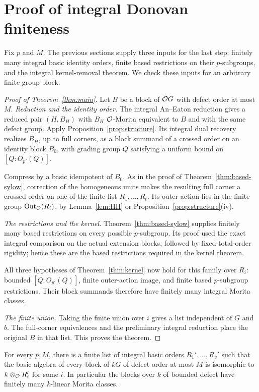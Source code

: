 \section{Proof of integral Donovan finiteness}\label{sec:assembly}

Fix $p$ and $M$.  The previous sections supply three inputs for the
last step: finitely many integral basic identity orders, finite based
restrictions on their $p$-subgroups, and the integral kernel-removal
theorem.  We check these inputs for an arbitrary finite-group block.

\begin{proof}[Proof of Theorem~\ref{thm:main}]
Let $B$ be a block of $\mathcal O G$ with defect order at most $M$.
\emph{Reduction and the identity order.}
The integral An--Eaton reduction gives a reduced pair
$(H,B_H)$ with $B_H$ $\mathcal O$-Morita equivalent to $B$ and with
the same defect group.  Apply
Proposition~\ref{prop:structure}.  Its integral dual recovery
realizes $B_H$, up to full corners, as a block summand of a
crossed order on an identity block $B_0$, with grading group
$Q$ satisfying a uniform bound on $[Q:O_{p'}(Q)]$.

Compress by a basic idempotent of $B_0$.  As in the proof of
Theorem~\ref{thm:based-sylow}, correction of the homogeneous
units makes the resulting full corner a crossed order on
one of the finite list $R_1,\ldots,R_t$.  Its outer action
lies in the finite group $\operatorname{Out}_{\mathcal O}(R_i)$, by
Lemma~\ref{lem:HH} or Proposition~\ref{prop:structure}(iv).

\emph{The restrictions and the kernel.}
Theorem~\ref{thm:based-sylow} supplies finitely many based
restrictions on every possible $p$-subgroup.  Its proof used the exact
integral comparison on the actual extension blocks, followed by
fixed-total-order rigidity; hence these are the based restrictions
required in the kernel theorem.

All three hypotheses of Theorem~\ref{thm:kernel} now hold for this
family over $R_i$: bounded $[Q:O_{p'}(Q)]$, finite outer-action
image, and finite based $p$-subgroup restrictions.  Their block
summands therefore have finitely many integral Morita classes.

\emph{The finite union.}
Taking
the finite union over $i$ gives a list independent of $G$
and $b$.  The full-corner equivalences and the preliminary
integral reduction place the original $B$ in that list.
This proves the theorem.
\end{proof}

\begin{corollary}\label{cor:reduction}
For every $p,M$, there is a finite list of integral basic
orders $R_1',\ldots,R_v'$ such that the basic algebra of
every block of $kG$ of defect order at most $M$ is
isomorphic to $k\otimes_{\mathcal O}R_i'$ for some $i$.
In particular the blocks over $k$ of bounded defect have
finitely many $k$-linear Morita classes.
\end{corollary}

